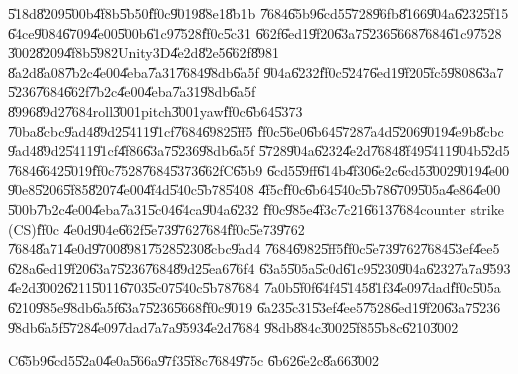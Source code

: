 \U{518d}\U{8209}\U{500b}\U{4f8b}\U{5b50}\U{ff0c}\U{9019}\U{88e1}\U{8b1b}%
\U{7684}\U{65b9}\U{6cd5}\U{5728}\U{96fb}\U{8166}\U{904a}\U{6232}\U{5f15}%
\U{64ce}\U{9084}\U{6709}\U{4e00}\U{500b}\U{61c9}\U{7528}\U{ff0c}\U{5c31}%
\U{662f}\U{6ed1}\U{9f20}\U{63a7}\U{5236}\U{5668}\U{7684}\U{61c9}\U{7528}%
\U{3002}\U{8209}\U{4f8b}\U{5982}Unity3D\U{4e2d}\U{82e5}\U{662f}\U{8981}%
\U{8a2d}\U{8a08}\U{7b2c}\U{4e00}\U{4eba}\U{7a31}\U{7684}\U{98db}\U{6a5f}%
\U{904a}\U{6232}\U{ff0c}\U{5247}\U{6ed1}\U{9f20}\U{5fc5}\U{9808}\U{63a7}%
\U{5236}\U{7684}\U{662f}\U{7b2c}\U{4e00}\U{4eba}\U{7a31}\U{98db}\U{6a5f}%
\U{8996}\U{89d2}\U{7684}roll\U{3001}pitch\U{3001}yaw\U{ff0c}\U{6b64}\U{5373}%
\U{70ba}\U{8cbc}\U{9ad4}\U{89d2}\U{5411}\U{91cf}\U{7684}\U{6982}\U{5ff5}%
\U{ff0c}\U{56e0}\U{6b64}\U{5728}\U{7a4d}\U{5206}\U{9019}\U{4e9b}\U{8cbc}%
\U{9ad4}\U{89d2}\U{5411}\U{91cf}\U{4f86}\U{63a7}\U{5236}\U{98db}\U{6a5f}%
\U{5728}\U{904a}\U{6232}\U{4e2d}\U{7684}\U{8f49}\U{5411}\U{904b}\U{52d5}%
\U{7684}\U{6642}\U{5019}\U{ff0c}\U{7528}\U{7684}\U{5373}\U{662f}C\U{65b9}%
\U{6cd5}\U{59ff}\U{614b}\U{4f30}\U{6e2c}\U{6cd5}\U{3002}\U{9019}\U{4e00}%
\U{90e8}\U{5206}\U{5f85}\U{8207}\U{4e00}\U{4f4d}\U{540c}\U{5b78}\U{5408}%
\U{4f5c}\U{ff0c}\U{6b64}\U{540c}\U{5b78}\U{6709}\U{505a}\U{4e86}\U{4e00}%
\U{500b}\U{7b2c}\U{4e00}\U{4eba}\U{7a31}\U{5c04}\U{64ca}\U{904a}\U{6232}%
\U{ff0c}\U{985e}\U{4f3c}\U{7c21}\U{6613}\U{7684}counter strike (CS)\U{ff0c}%
\U{4e0d}\U{904e}\U{662f}\U{5e73}\U{9762}\U{7684}\U{ff0c}\U{5e73}\U{9762}%
\U{7684}\U{8a71}\U{4e0d}\U{9700}\U{8981}\U{7528}\U{5230}\U{8cbc}\U{9ad4}%
\U{7684}\U{6982}\U{5ff5}\U{ff0c}\U{5e73}\U{9762}\U{7684}\U{53ef}\U{4ee5}%
\U{628a}\U{6ed1}\U{9f20}\U{63a7}\U{5236}\U{7684}\U{89d2}\U{5ea6}\U{76f4}%
\U{63a5}\U{505a}\U{5c0d}\U{61c9}\U{5230}\U{904a}\U{6232}\U{7a7a}\U{9593}%
\U{4e2d}\U{3002}\U{6211}\U{5011}\U{6703}\U{5c07}\U{540c}\U{5b78}\U{7684}%
\U{7a0b}\U{5f0f}\U{64f4}\U{5145}\U{81f3}\U{4e09}\U{7dad}\U{ff0c}\U{505a}%
\U{6210}\U{985e}\U{98db}\U{6a5f}\U{63a7}\U{5236}\U{5668}\U{ff0c}\U{9019}%
\U{6a23}\U{5c31}\U{53ef}\U{4ee5}\U{7528}\U{6ed1}\U{9f20}\U{63a7}\U{5236}%
\U{98db}\U{6a5f}\U{5728}\U{4e09}\U{7dad}\U{7a7a}\U{9593}\U{4e2d}\U{7684}%
\U{98db}\U{884c}\U{3002}\U{5f85}\U{5b8c}\U{6210}\U{3002}

\clearpage%

\begin{case}
C\U{65b9}\U{6cd5}\U{52a0}\U{4e0a}\U{566a}\U{97f3}\U{5f8c}\U{7684}\U{975c}%
\U{6b62}\U{6e2c}\U{8a66}\U{3002}
\end{case}

